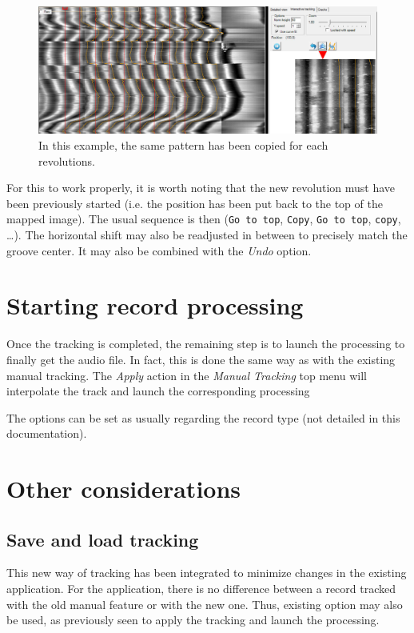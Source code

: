 \begin{figure}[!ht]
\centering
\includegraphics[width=1.0\textwidth]{images/int-copy-pattern}
\caption{In this example, the same pattern has been copied for each revolutions.}
\label{fig:copypattern}
\end{figure}

For this to work properly, it is worth noting that the new revolution must have been previously started (i.e. the position has been put back to the top of the mapped image). The usual sequence is then (\texttt{Go to top}, \texttt{Copy}, \texttt{Go to top}, \texttt{copy}, \dots ). The horizontal shift may also be readjusted in between to precisely match the groove center. It may also be combined with the \emph{Undo} option.

\section{Starting record processing}

Once the tracking is completed, the remaining step is to launch the processing to finally get the audio file. In fact, this is done the same way as with the existing manual tracking. The \emph{Apply} action in the \emph{Manual Tracking} top menu will interpolate the track and launch the corresponding processing

The options can be set as usually regarding the record type (not detailed in this documentation).

\section{Other considerations}

\subsection{Save and load tracking}

This new way of tracking has been integrated to minimize changes in the existing application. For the application, there is no difference between a record tracked with the old manual feature or with the new one. Thus, existing option may also be used, as previously seen to apply the tracking and launch the processing.


